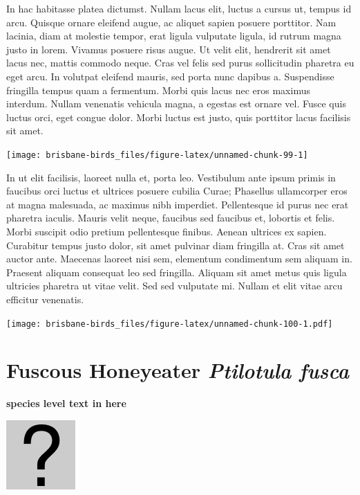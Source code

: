 \documentclass[]{book}
\let\origfigure\figure
\let\endorigfigure\endfigure
\renewenvironment{figure}[1][2] {
  \expandafter\origfigure\expandafter[H]
} {
  \endorigfigure
}
\begin{document}
In hac habitasse platea dictumst. Nullam lacus elit, luctus a cursus ut,
tempus id arcu. Quisque ornare eleifend augue, ac aliquet sapien posuere
porttitor. Nam lacinia, diam at molestie tempor, erat ligula vulputate
ligula, id rutrum magna justo in lorem. Vivamus posuere risus augue. Ut
velit elit, hendrerit sit amet lacus nec, mattis commodo neque. Cras vel
felis sed purus sollicitudin pharetra eu eget arcu. In volutpat eleifend
mauris, sed porta nunc dapibus a. Suspendisse fringilla tempus quam a
fermentum. Morbi quis lacus nec eros maximus interdum. Nullam venenatis
vehicula magna, a egestas est ornare vel. Fusce quis luctus orci, eget
congue dolor. Morbi luctus est justo, quis porttitor lacus facilisis sit
amet.

\begin{figure}
\texttt{[image: brisbane-birds\_files/figure-latex/unnamed-chunk-99-1]} \caption{insert figure caption}\label{fig:unnamed-chunk-99}
\end{figure}

In ut elit facilisis, laoreet nulla et, porta leo. Vestibulum ante ipsum
primis in faucibus orci luctus et ultrices posuere cubilia Curae;
Phasellus ullamcorper eros at magna malesuada, ac maximus nibh
imperdiet. Pellentesque id purus nec erat pharetra iaculis. Mauris velit
neque, faucibus sed faucibus et, lobortis et felis. Morbi suscipit odio
pretium pellentesque finibus. Aenean ultrices ex sapien. Curabitur
tempus justo dolor, sit amet pulvinar diam fringilla at. Cras sit amet
auctor ante. Maecenas laoreet nisi sem, elementum condimentum sem
aliquam in. Praesent aliquam consequat leo sed fringilla. Aliquam sit
amet metus quis ligula ultricies pharetra ut vitae velit. Sed sed
vulputate mi. Nullam et elit vitae arcu efficitur venenatis.

\begin{figure}
\centering
\texttt{[image: brisbane-birds\_files/figure-latex/unnamed-chunk-100-1.pdf]}
\caption{\label{fig:unnamed-chunk-100}insert figure caption}
\end{figure}

\section{\texorpdfstring{Fuscous Honeyeater \emph{Ptilotula
fusca}}{Fuscous Honeyeater Ptilotula fusca}}\label{fuscous-honeyeater-ptilotula-fusca}

\textbf{species level text in here}

\begin{figure}
\centering
\includegraphics{assets/missing.png}
\caption{No image for species}
\end{figure}
\end{document}
